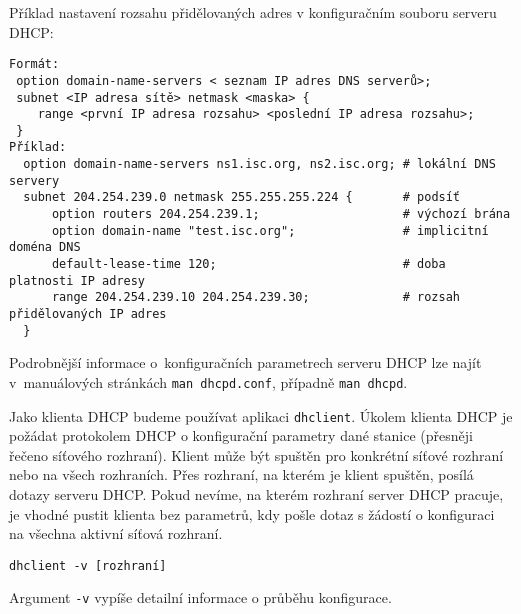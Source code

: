 Příklad nastavení rozsahu přidělovaných adres v konfiguračním souboru serveru DHCP:
\begin{verbatim}
Formát:
 option domain-name-servers < seznam IP adres DNS serverů>;
 subnet <IP adresa sítě> netmask <maska> {
    range <první IP adresa rozsahu> <poslední IP adresa rozsahu>;
 }
Příklad:
  option domain-name-servers ns1.isc.org, ns2.isc.org; # lokální DNS servery
  subnet 204.254.239.0 netmask 255.255.255.224 {       # podsíť 
      option routers 204.254.239.1;                    # výchozí brána
      option domain-name "test.isc.org";               # implicitní doména DNS 
      default-lease-time 120;                          # doba platnosti IP adresy
      range 204.254.239.10 204.254.239.30;             # rozsah přidělovaných IP adres
  }
\end{verbatim}
Podrobnější informace o~konfiguračních parametrech serveru DHCP lze najít v~manuálových stránkách {\tt man dhcpd.conf}, případně {\tt man dhcpd}.

Jako klienta DHCP budeme používat aplikaci \texttt{dhclient}. Úkolem klienta DHCP je požádat protokolem DHCP o konfigurační parametry dané stanice (přesněji řečeno síťového rozhraní). Klient může být spuštěn pro konkrétní síťové rozhraní nebo na všech rozhraních. Přes rozhraní, na kterém je klient spuštěn, posílá dotazy serveru DHCP. Pokud nevíme, na kterém rozhraní server DHCP pracuje, je vhodné pustit klienta bez parametrů, kdy pošle dotaz s žádostí o konfiguraci na všechna aktivní síťová rozhraní. 
\begin{verbatim}
dhclient -v [rozhraní]
\end{verbatim}
Argument \texttt{-v} vypíše detailní informace o průběhu konfigurace.

